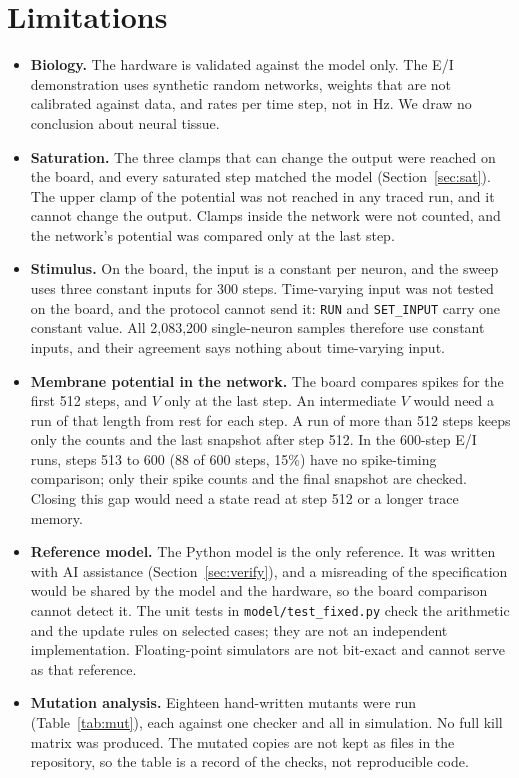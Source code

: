 \documentclass[11pt]{article}
\begin{document}
\section{Limitations}
\label{sec:limits}
\begin{itemize}
\item \textbf{Biology.} The hardware is validated against the model only. The E/I demonstration uses synthetic random networks, weights that are not calibrated against data, and rates per time step, not in Hz. We draw no conclusion about neural tissue.
\item \textbf{Saturation.} The three clamps that can change the output were reached on the board, and every saturated step matched the model (Section~\ref{sec:sat}). The upper clamp of the potential was not reached in any traced run, and it cannot change the output. Clamps inside the network were not counted, and the network's potential was compared only at the last step.
\item \textbf{Stimulus.} On the board, the input is a constant per neuron, and the sweep uses three constant inputs for 300 steps. Time-varying input was not tested on the board, and the protocol cannot send it: \texttt{RUN} and \texttt{SET\_INPUT} carry one constant value. All 2,083,200 single-neuron samples therefore use constant inputs, and their agreement says nothing about time-varying input.
\item \textbf{Membrane potential in the network.} The board compares spikes for the first 512 steps, and $V$ only at the last step. An intermediate $V$ would need a run of that length from rest for each step. A run of more than 512 steps keeps only the counts and the last snapshot after step 512. In the 600-step E/I runs, steps 513 to 600 (88 of 600 steps, 15\%) have no spike-timing comparison; only their spike counts and the final snapshot are checked. Closing this gap would need a state read at step 512 or a longer trace memory.
\item \textbf{Reference model.} The Python model is the only reference. It was written with AI assistance (Section~\ref{sec:verify}), and a misreading of the specification would be shared by the model and the hardware, so the board comparison cannot detect it. The unit tests in \texttt{model/test\_fixed.py} check the arithmetic and the update rules on selected cases; they are not an independent implementation. Floating-point simulators are not bit-exact and cannot serve as that reference.
\item \textbf{Mutation analysis.} Eighteen hand-written mutants were run (Table~\ref{tab:mut}), each against one checker and all in simulation. No full kill matrix was produced. The mutated copies are not kept as files in the repository, so the table is a record of the checks, not reproducible code.

\end{itemize}
\end{document}
